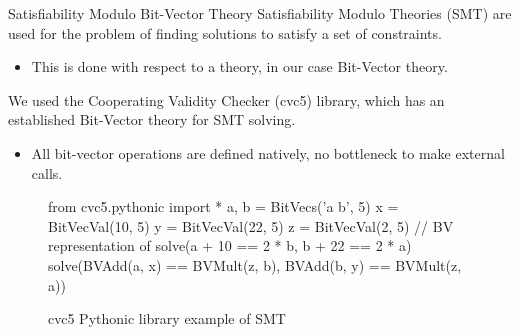 \documentclass{beamer}
\begin{document}
\begin{frame}[fragile]{Satisfiability Modulo Bit-Vector Theory}
    Satisfiability Modulo Theories (SMT) are used for the problem of finding solutions to satisfy a set of constraints.
    \begin{itemize}
        \item This is done with respect to a theory, in our case Bit-Vector theory.
    \end{itemize}
    We used the Cooperating Validity Checker (cvc5) library, which has an established Bit-Vector theory for SMT solving.
    \begin{itemize}
    \item All bit-vector operations are defined natively, no bottleneck to make external calls.
    \end{itemize}
    \begin{figure}
        {\footnotesize
        \begin{center} 
            \begin{verbatimtab}
from cvc5.pythonic import *
a, b = BitVecs('a b', 5)
x = BitVecVal(10, 5)
y = BitVecVal(22, 5)
z = BitVecVal(2, 5)
// BV representation of solve(a + 10 == 2 * b, b + 22 == 2 * a)
solve(BVAdd(a, x) == BVMult(z, b), BVAdd(b, y) == BVMult(z, a))
        \end{verbatimtab}
        \end{center}
        }
        \caption{cvc5 Pythonic library example of SMT}
        \label{fig-cvc5}
    \end{figure}
\end{frame}
\end{document}
